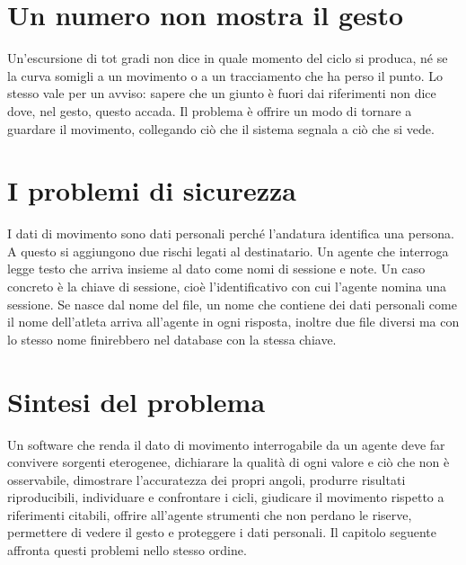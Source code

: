 \section{Un numero non mostra il gesto}
\label{sec:ch2:vedere}

Un'escursione di tot gradi non dice in quale momento del ciclo si produca, né se
la curva somigli a un movimento o a un tracciamento che ha perso il punto. Lo
stesso vale per un avviso: sapere che un giunto è fuori dai riferimenti non dice
dove, nel gesto, questo accada. Il problema è offrire un modo di tornare a
guardare il movimento, collegando ciò che il sistema segnala a ciò che si vede.

\section{I problemi di sicurezza}
\label{sec:ch2:sicurezza}

I dati di movimento sono dati personali perché l'andatura identifica una
persona. A questo si aggiungono due rischi legati al destinatario. Un agente che
interroga legge testo che arriva insieme al dato come nomi di sessione e note. 
Un caso concreto è la chiave di sessione, cioè l'identificativo con cui l'agente
nomina una sessione. Se nasce dal nome del file, un nome che contiene dei dati personali come il nome dell'atleta 
arriva all'agente in ogni risposta, inoltre due file diversi ma con lo stesso nome finirebbero nel database con la stessa chiave.

\section{Sintesi del problema}
\label{sec:ch2:sintesi}

Un software che renda il dato di movimento interrogabile da un agente deve far
convivere sorgenti eterogenee, dichiarare la qualità di ogni valore e ciò che non
è osservabile, dimostrare l'accuratezza dei propri angoli, produrre risultati
riproducibili, individuare e confrontare i cicli, giudicare il movimento rispetto
a riferimenti citabili, offrire all'agente strumenti che non perdano le riserve,
permettere di vedere il gesto e proteggere i dati personali. Il capitolo
seguente affronta questi problemi nello stesso ordine.
